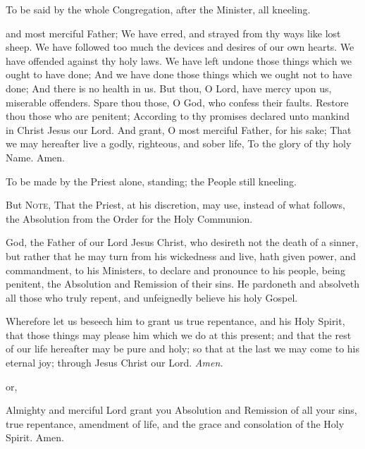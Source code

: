 \begin{rubric}
    To be said by the whole Congregation, after the Minister, all kneeling.
\end{rubric}
 and most merciful Father; We have erred, and strayed from thy ways like lost sheep. We have followed too much the devices and desires of our own hearts. We have offended against thy holy laws. We have left undone those things which we ought to have done; And we have done those things which we ought not to have done; And there is no health in us. But thou, O Lord, have mercy upon us, miserable offenders. Spare thou those, O God, who confess their faults. Restore thou those who are penitent; According to thy promises declared unto mankind in Christ Jesus our Lord. And grant, O most merciful Father, for his sake; That we may hereafter live a godly, righteous, and sober life, To the glory of thy holy Name. Amen.
\begin{rubric}
    To be made by the Priest alone, standing; the People still kneeling.
\end{rubric}
\begin{rubric}
    But \textsc{Note}, That the Priest, at his discretion, may use, instead of what follows, the Absolution from the Order for the Holy Communion.
\end{rubric}
 God, the Father of our Lord Jesus Christ, who desireth not the death of a sinner, but rather that he may turn from his wickedness and live, hath given power, and commandment, to his Ministers, to declare and pronounce to his people, being penitent, the Absolution and Remission of their sins. He pardoneth and {} absolveth all those who truly repent, and unfeignedly believe his holy Gospel.
\par
Wherefore let us beseech him to grant us true repentance, and his Holy Spirit, that those things may please him which we do at this present; and that the rest of our life hereafter may be pure and holy; so that at the last we may come to his eternal joy; through Jesus Christ our Lord. \textit{Amen.}
\begin{inhead}
    or,
\end{inhead}
 Almighty and merciful Lord grant you Absolution {} and Remission of all your sins, true repentance, amendment of life, and the grace and consolation of the Holy Spirit. Amen.
